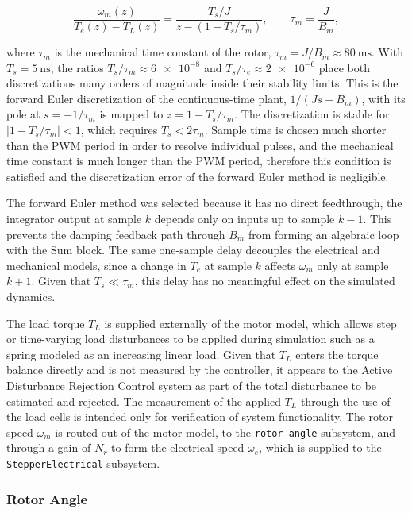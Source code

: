 \begin{equation}
	\frac{\omega_m(z)}{T_e(z) - T_L(z)}
	= \frac{T_s / J}{z - \left( 1 - T_s / \tau_m \right)},
	\qquad \tau_m = \frac{J}{B_m},
	\label{eq:speed_tf}
\end{equation}



where $\tau_m$ is the mechanical time constant of the rotor, $\tau_m = J/B_m \approx \SI{80}{\milli\second}$. With $T_s = \SI{5}{\nano\second}$, the ratios $T_s/\tau_m \approx \num{6e-8}$ and $T_s/\tau_e \approx \num{2e-6}$ place both discretizations many orders of magnitude inside their stability limits. This is the forward Euler discretization of the continuous-time plant, $1/(Js + B_m)$, with its pole at $s = -1/\tau_m$ is mapped to $z = 1 - T_s/\tau_m$. The discretization is stable for $\left|1 - T_s/\tau_m\right| < 1$, which requires $T_s < 2\tau_m$. Sample time is chosen much shorter than the PWM period in order to resolve individual pulses, and the mechanical time constant is much longer than the PWM period, therefore this condition is satisfied and the discretization error of the forward Euler method is negligible.

The forward Euler method was selected because it has no direct feedthrough, the integrator output at sample $k$ depends only on inputs up to sample $k-1$. This prevents the damping feedback path through $B_m$ from forming an algebraic loop with the Sum block. The same one-sample delay decouples the electrical and mechanical models, since a change in $T_e$ at sample $k$ affects $\omega_m$ only at sample $k+1$. Given that $T_s \ll \tau_m$, this delay has no meaningful effect on the simulated dynamics.

The load torque $T_L$ is supplied externally of the motor model, which allows step or time-varying load disturbances to be applied during simulation such as a spring modeled as an increasing linear load. Given that $T_L$ enters the torque balance directly and is not measured by the controller, it appears to the Active Disturbance Rejection Control system as part of the total disturbance to be estimated and rejected. The measurement of the applied $T_L$ through the use of the load cells is intended only for verification of system functionality. The rotor speed $\omega_m$ is routed out of the motor model, to the \texttt{rotor angle} subsystem, and through a gain of $N_r$ to form the electrical speed $\omega_e$, which is supplied to the \texttt{StepperElectrical} subsystem.

\subsubsection{Rotor Angle}

